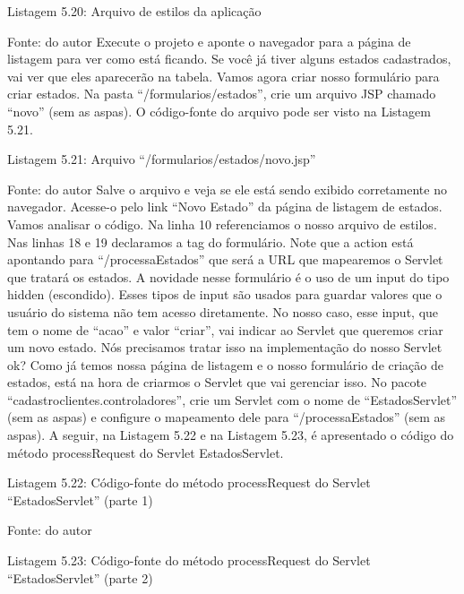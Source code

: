 Listagem 5.20: Arquivo de estilos da aplicação
 
Fonte: do autor
Execute o projeto e aponte o navegador para a página de listagem para ver como está ficando. Se você já tiver alguns estados cadastrados, vai ver que eles aparecerão na tabela. Vamos agora criar nosso formulário para criar estados. Na pasta “/formularios/estados”, crie um arquivo JSP chamado “novo” (sem as aspas). O código-fonte do arquivo pode ser visto na Listagem 5.21.



Listagem 5.21: Arquivo “/formularios/estados/novo.jsp”
 
Fonte: do autor
Salve o arquivo e veja se ele está sendo exibido corretamente no navegador. Acesse-o pelo link “Novo Estado” da página de listagem de estados. Vamos analisar o código. Na linha 10 referenciamos o nosso arquivo de estilos. Nas linhas 18 e 19 declaramos a tag do formulário. Note que a action está apontando para “/processaEstados” que será a URL que mapearemos o Servlet que tratará os estados. A novidade nesse formulário é o uso de um input do tipo hidden (escondido). Esses tipos de input são usados para guardar valores que o usuário do sistema não tem acesso diretamente. No nosso caso, esse input, que tem o nome de “acao” e valor “criar”, vai indicar ao Servlet que queremos criar um novo estado. Nós precisamos tratar isso na implementação do nosso Servlet ok? Como já temos nossa página de listagem e o nosso formulário de criação de estados, está na hora de criarmos o Servlet que vai gerenciar isso. No pacote “cadastroclientes.controladores”, crie um Servlet com o nome de “EstadosServlet” (sem as aspas) e configure o mapeamento dele para “/processaEstados” (sem as aspas).
A seguir, na Listagem 5.22 e na Listagem 5.23, é apresentado o código do método processRequest do Servlet EstadosServlet.




















Listagem 5.22: Código-fonte do método processRequest do Servlet “EstadosServlet” (parte 1)
 
Fonte: do autor





Listagem 5.23: Código-fonte do método processRequest do Servlet “EstadosServlet” (parte 2)
 
